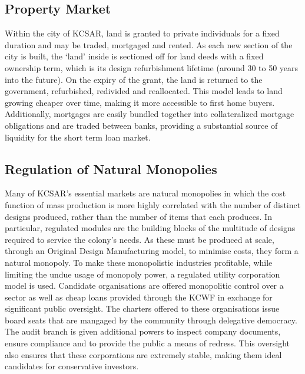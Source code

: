 \documentclass[fleqn,10pt]{Stylesheet} %
\begin{document}
\subsection{Property Market}
Within the city of KCSAR, land is granted to private individuals for a fixed duration and may be traded, mortgaged and rented. As each new section of the city is built, the ‘land’ inside is sectioned off for land deeds with a fixed ownership term, which is its design refurbishment lifetime (around 30 to 50 years into the future). On the expiry of the grant, the land is returned to the government, refurbished, redivided and reallocated. This model leads to land growing cheaper over time, making it more accessible to first home buyers. Additionally, mortgages are easily bundled together into collateralized mortgage obligations and are traded between banks, providing a substantial source of liquidity for the short term loan market.

\subsection{Regulation of Natural Monopolies}
Many of KCSAR's essential markets are natural monopolies in which the cost function of mass production is more highly correlated with the number of distinct designs produced, rather than the number of items that each produces. In particular, regulated modules are the building blocks of the multitude of designs required to service the colony's needs. As these must be produced at scale, through an Original Design Manufacturing model, to minimise costs, they form a natural monopoly. To make these monopolistic industries profitable, while limiting the undue usage of monopoly power, a regulated utility corporation model is used. Candidate organisations are offered monopolitic control over a sector as well as cheap loans provided through the KCWF in exchange for significant public oversight. The charters offered to these organisations issue board seats that are mangaged by the community through delegative democracy. The audit branch is given additional powers to inspect company documents, ensure compliance and to provide the public a means of redress. This oversight also ensures that these corporations are extremely stable, making them ideal candidates for conservative investors.
\end{document}
